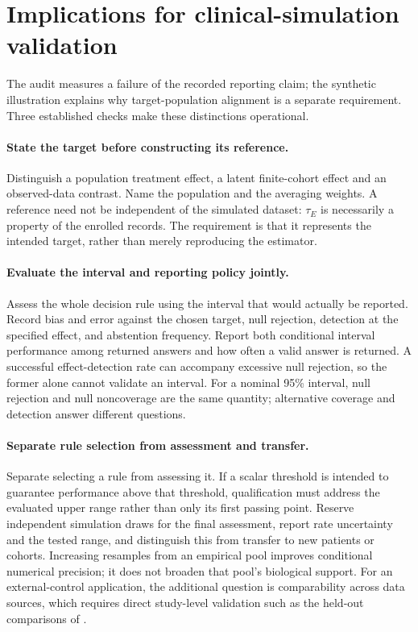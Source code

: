 \section{Implications for clinical-simulation validation}
\label{sec:validation}

The audit measures a failure of the recorded reporting claim; the synthetic
illustration explains why target-population alignment is a separate requirement.
Three established checks make these distinctions operational.

\paragraph{State the target before constructing its reference.}
Distinguish a population treatment effect, a latent finite-cohort effect and
an observed-data contrast. Name the population and the averaging weights.
A reference need not be independent of the simulated dataset: $\tau_E$ is
necessarily a property of the enrolled records. The requirement is that it
represents the intended target, rather than merely reproducing the estimator.

\paragraph{Evaluate the interval and reporting policy jointly.}
Assess the whole decision rule using the interval that would actually
be reported. Record bias and error against the chosen target, null rejection,
detection at the specified effect, and abstention frequency. Report both
conditional interval performance among returned answers and how often a valid
answer is returned. A successful effect-detection rate can accompany excessive
null rejection, so the former alone cannot validate an interval. For a nominal 95\% interval, null rejection and null noncoverage are
the same quantity; alternative coverage and detection answer different questions.

\paragraph{Separate rule selection from assessment and transfer.}
Separate selecting a rule from assessing it. If a scalar threshold is
intended to guarantee performance above that threshold, qualification must
address the evaluated upper range rather than only its first passing point.
Reserve independent simulation draws for the final assessment, report rate
uncertainty and the tested range, and distinguish this from transfer to new
patients or cohorts. Increasing resamples from an empirical pool improves
conditional numerical precision; it does not broaden that pool's biological
support. For an external-control application, the additional question is
comparability across data sources, which requires direct study-level validation
such as the held-out comparisons of \citet{ventz2019}.
